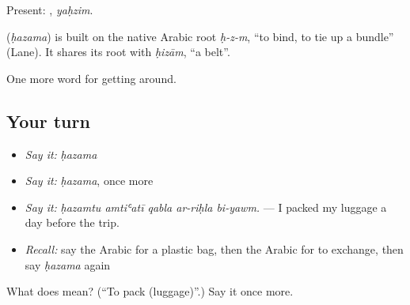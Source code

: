 Present: , \emph{yaḥzim}.

\begin{cousinweb}
\textbf{} (\emph{ḥazama}) is built on the native Arabic root \emph{ḥ-z-m}, \textquotedblleft{}to bind, to tie up a bundle\textquotedblright{} (Lane). It shares its root with \emph{ḥizām}, \textquotedblleft{}a belt\textquotedblright{}.
\end{cousinweb}

\begin{grammarlens}[title={What you've built}]
One more word for getting around.
\end{grammarlens}

\subsection*{Your turn}
\begin{itemize}
\raggedright
  \item \emph{Say it:} \emph{ḥazama}
  \item \emph{Say it:} \emph{ḥazama}, once more
  \item \emph{Say it:} \emph{ḥazamtu amtiʿatī qabla ar-riḥla bi-yawm.} — I packed my luggage a day before the trip.
  \item \emph{Recall:} say the Arabic for a plastic bag, then the Arabic for to exchange, then say \emph{ḥazama} again
\end{itemize}

\begin{tcolorbox}[breakable,colback=teal!4,colframe=teal!35!black,title={Before you move on}]
What does  mean? (\textquotedblleft{}To pack (luggage)\textquotedblright{}.) Say it once more.
\end{tcolorbox}
